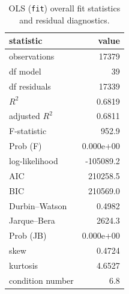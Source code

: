 \begin{table}[htbp]
\centering
\caption{OLS (\texttt{fit}) overall fit statistics and residual diagnostics.}\label{tab:ols-fitstats}
\begin{tabular}{lr}
\toprule
statistic & value \\
\midrule
observations & 17379 \\
df model & 39 \\
df residuals & 17339 \\
$R^2$ & 0.6819 \\
adjusted $R^2$ & 0.6811 \\
F-statistic & 952.9 \\
Prob (F) & 0.000e+00 \\
log-likelihood & -105089.2 \\
AIC & 210258.5 \\
BIC & 210569.0 \\
Durbin--Watson & 0.4982 \\
Jarque--Bera & 2624.3 \\
Prob (JB) & 0.000e+00 \\
skew & 0.4724 \\
kurtosis & 4.6527 \\
condition number & 6.8 \\
\bottomrule
\end{tabular}
\end{table}
